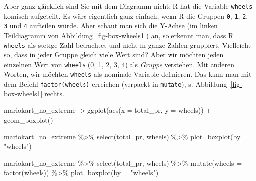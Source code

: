 \documentclass[
  letterpaper,
  oneside,
  open=any]{scrbook}
\newenvironment{Shaded}{\begin{snugshade}}{\end{snugshade}}
\newcommand{\AttributeTok}[1]{\textcolor[rgb]{0.40,0.45,0.13}{#1}}
\newcommand{\FunctionTok}[1]{\textcolor[rgb]{0.28,0.35,0.67}{#1}}
\newcommand{\NormalTok}[1]{\textcolor[rgb]{0.00,0.23,0.31}{#1}}
\newcommand{\SpecialCharTok}[1]{\textcolor[rgb]{0.37,0.37,0.37}{#1}}
\newcommand{\StringTok}[1]{\textcolor[rgb]{0.13,0.47,0.30}{#1}}
\theoremstyle{definition}
\theoremstyle{definition}
\theoremstyle{definition}
\theoremstyle{remark}
\begin{document}
Aber ganz glücklich sind Sie mit dem Diagramm nicht: R hat die Variable
\texttt{wheels} komisch aufgeteilt. Es wäre eigentlich ganz einfach,
wenn R die Gruppen \texttt{0}, \texttt{1}, \texttt{2}, \texttt{3} und
\texttt{4} aufteilen würde. Aber schaut man sich die Y-Achse (im linken
Teildiagramm von Abbildung~\ref{fig-box-wheels1}) an, so erkennt man,
dass R \texttt{wheels} als stetige Zahl betrachtet und nicht in ganze
Zahlen gruppiert. Vielleicht so, dass in jeder Gruppe gleich viele Wert
sind? Aber wir möchten jeden einzelnen Wert von \texttt{wheels} (0, 1,
2, 3, 4) als \emph{Gruppe} verstehen. Mit anderen Worten, wir möchten
\texttt{wheels} als nominale Variable definieren. Das kann man mit dem
Befehl \texttt{factor(wheels)} erreichen (verpackt in \texttt{mutate}),
s. Abbildung~\ref{fig-box-wheels1} rechts.

\begin{Shaded}
\begin{Highlighting}[]
\NormalTok{mariokart\_no\_extreme }\SpecialCharTok{|\textgreater{}} 
  \FunctionTok{ggplot}\NormalTok{(}\FunctionTok{aes}\NormalTok{(}\AttributeTok{x =}\NormalTok{ total\_pr, }\AttributeTok{y =}\NormalTok{ wheels)) }\SpecialCharTok{+}
  \FunctionTok{geom\_boxplot}\NormalTok{()}
\end{Highlighting}
\end{Shaded}

\begin{Shaded}
\begin{Highlighting}[]
\NormalTok{mariokart\_no\_extreme }\SpecialCharTok{\%\textgreater{}\%} 
  \FunctionTok{select}\NormalTok{(total\_pr, wheels) }\SpecialCharTok{\%\textgreater{}\%} 
  \FunctionTok{plot\_boxplot}\NormalTok{(}\AttributeTok{by =} \StringTok{"wheels"}\NormalTok{) }

\NormalTok{mariokart\_no\_extreme }\SpecialCharTok{\%\textgreater{}\%} 
  \FunctionTok{select}\NormalTok{(total\_pr, wheels) }\SpecialCharTok{\%\textgreater{}\%} 
  \FunctionTok{mutate}\NormalTok{(}\AttributeTok{wheels =} \FunctionTok{factor}\NormalTok{(wheels)) }\SpecialCharTok{\%\textgreater{}\%} 
  \FunctionTok{plot\_boxplot}\NormalTok{(}\AttributeTok{by =} \StringTok{"wheels"}\NormalTok{) }
\end{Highlighting}
\end{Shaded}
\end{document}
